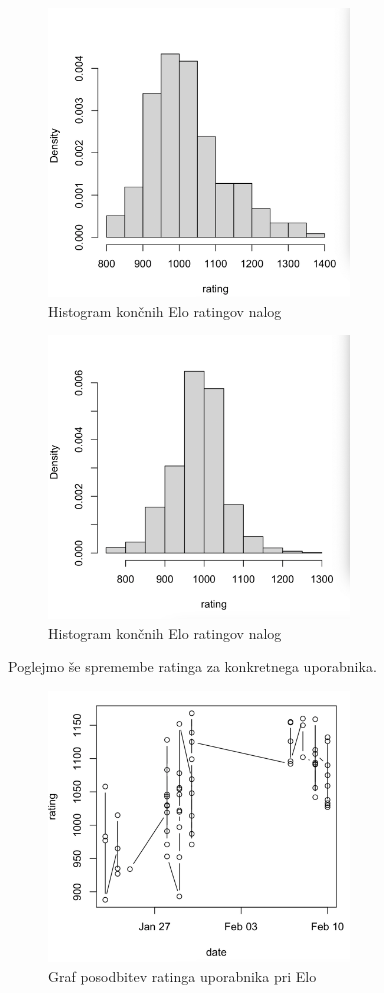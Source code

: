 \documentclass{IEEEtran}
\begin{document}
\begin{figure}[h!]
    \includegraphics[width=8cm]{EloUser}
    \caption{Histogram končnih Elo ratingov nalog}%
    \label{fig:eloU}%
\end{figure}
\begin{figure}[h!]
    \includegraphics[width=8cm]{EloExercise}
    \caption{Histogram končnih Elo ratingov nalog}%
    \label{fig:eloE}%
\end{figure}
\newpage
Poglejmo še spremembe ratinga za konkretnega uporabnika.

\begin{figure}[h!]
    \includegraphics[width=8cm]{UserExampleSElo}
    \caption{Graf posodbitev ratinga uporabnika pri Elo}%
    \label{fig:uexse}%
\end{figure}
\end{document}
